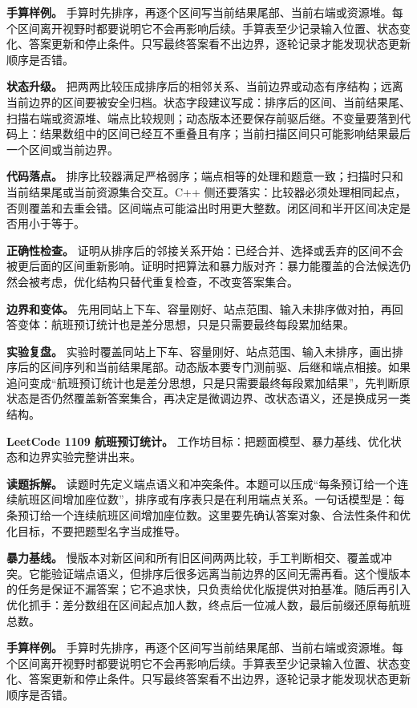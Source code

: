 \textbf{手算样例。} 手算时先排序，再逐个区间写当前结果尾部、当前右端或资源堆。每个区间离开视野时都要说明它不会再影响后续。手算表至少记录输入位置、状态变化、答案更新和停止条件。只写最终答案看不出边界，逐轮记录才能发现状态更新顺序是否错。

\textbf{状态升级。} 把两两比较压成排序后的相邻关系、当前边界或动态有序结构；远离当前边界的区间要被安全归档。状态字段建议写成：排序后的区间、当前结果尾、扫描右端或资源堆、端点比较规则；动态版本还要保存前驱后继。不变量要落到代码上：结果数组中的区间已经互不重叠且有序；当前扫描区间只可能影响结果最后一个区间或当前边界。

\textbf{代码落点。} 排序比较器满足严格弱序；端点相等的处理和题意一致；扫描时只和当前结果尾或当前资源集合交互。C++ 侧还要落实：比较器必须处理相同起点，否则覆盖和去重会错。区间端点可能溢出时用更大整数。闭区间和半开区间决定是否用小于等于。

\textbf{正确性检查。} 证明从排序后的邻接关系开始：已经合并、选择或丢弃的区间不会被更后面的区间重新影响。证明时把算法和暴力版对齐：暴力能覆盖的合法候选仍然会被考虑，优化结构只替代重复检查，不改变答案集合。

\textbf{边界和变体。} 先用同站上下车、容量刚好、站点范围、输入未排序做对拍，再回答变体：航班预订统计也是差分思想，只是只需要最终每段累加结果。

\textbf{实验复盘。} 实验时覆盖同站上下车、容量刚好、站点范围、输入未排序，画出排序后的区间序列和当前结果尾部。动态版本要专门测前驱、后继和端点相接。如果追问变成“航班预订统计也是差分思想，只是只需要最终每段累加结果”，先判断原状态是否仍然覆盖新答案集合，再决定是微调边界、改状态语义，还是换成另一类结构。

\noindent\textbf{LeetCode 1109 航班预订统计。} 工作坊目标：把题面模型、暴力基线、优化状态和边界实验完整讲出来。

\textbf{读题拆解。} 读题时先定义端点语义和冲突条件。本题可以压成“每条预订给一个连续航班区间增加座位数”，排序或有序表只是在利用端点关系。一句话模型是：每条预订给一个连续航班区间增加座位数。这里要先确认答案对象、合法性条件和优化目标，不要把题型名字当成推导。

\textbf{暴力基线。} 慢版本对新区间和所有旧区间两两比较，手工判断相交、覆盖或冲突。它能验证端点语义，但排序后很多远离当前边界的区间无需再看。这个慢版本的任务是保证不漏答案；它不追求快，只负责给优化版提供对拍基准。随后再引入优化抓手：差分数组在区间起点加人数，终点后一位减人数，最后前缀还原每航班总数。

\textbf{手算样例。} 手算时先排序，再逐个区间写当前结果尾部、当前右端或资源堆。每个区间离开视野时都要说明它不会再影响后续。手算表至少记录输入位置、状态变化、答案更新和停止条件。只写最终答案看不出边界，逐轮记录才能发现状态更新顺序是否错。

